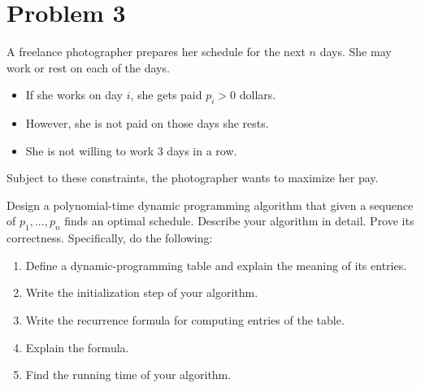 \newpage
\section{Problem 3}
A freelance photographer prepares her schedule for the next $n$ days. She may work or rest on each of the days.
\begin{itemize}
    \item If she works on day $i$, she gets paid $p_i > 0$ dollars.
    \item However, she is not paid on those days she rests.
    \item She is not willing to work 3 days in a row.
\end{itemize}
Subject to these constraints, the photographer wants to maximize her pay.\par
Design a polynomial-time dynamic programming algorithm that given a sequence of $p_1, ..., p_n$ finds an optimal schedule. Describe your algorithm in detail. Prove its correctness. Specifically, do the following:
\begin{enumerate}
    \item Define a dynamic-programming table and explain the meaning of its entries.
    \item Write the initialization step of your algorithm.
    \item Write the recurrence formula for computing entries of the table.
    \item Explain the formula.
    \item Find the running time of your algorithm.
\end{enumerate}

